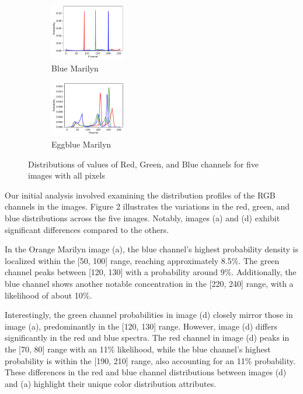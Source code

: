 \documentclass{article}
\begin{document}
\begin{figure}[ht]
  \begin{minipage}{0.6\textwidth}
    \centering
    \begin{subfigure}{0.45\textwidth}
      \centering
      \includegraphics[width=125px]{main_files/figure-latex/2_4_blue_marilyn_dist.pdf}
      \caption{Blue Marilyn}
      \label{fig:2_4_blue_marilyn_dist}
    \end{subfigure}
    \hfill
    \begin{subfigure}{0.45\textwidth}
      \centering
      \includegraphics[width=125px]{main_files/figure-latex/2_5_eggblue_marilyn_dist.pdf}
      \caption{Eggblue Marilyn}
      \label{fig:2_5_eggblue_marilyn_dist}
    \end{subfigure}
  \end{minipage}

  \caption{Distributions of values of Red, Green, and Blue channels for five images with all pixels}
  \label{fig:marilyn_dist}
\end{figure}

Our initial analysis involved examining the distribution profiles of the
RGB channels in the images. Figure 2 illustrates the variations in the
red, green, and blue distributions across the five images. Notably,
images (a) and (d) exhibit significant differences compared to the
others.

In the Orange Marilyn image (a), the blue channel's highest probability
density is localized within the {[}50, 100{]} range, reaching
approximately 8.5\%. The green channel peaks between {[}120, 130{]} with
a probability around 9\%. Additionally, the blue channel shows another
notable concentration in the {[}220, 240{]} range, with a likelihood of
about 10\%.

Interestingly, the green channel probabilities in image (d) closely
mirror those in image (a), predominantly in the {[}120, 130{]} range.
However, image (d) differs significantly in the red and blue spectra.
The red channel in image (d) peaks in the {[}70, 80{]} range with an
11\% likelihood, while the blue channel's highest probability is within
the {[}190, 210{]} range, also accounting for an 11\% probability. These
differences in the red and blue channel distributions between images (d)
and (a) highlight their unique color distribution attributes.
\end{document}
